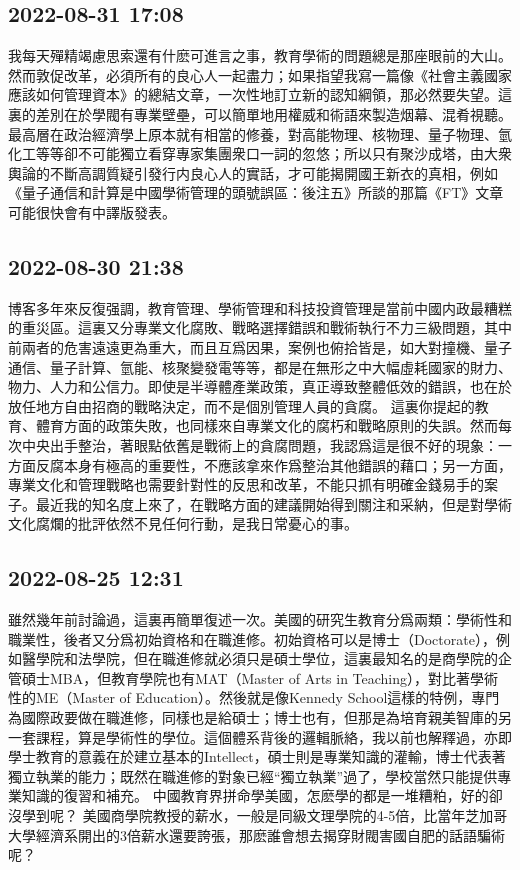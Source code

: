 \documentclass[twocolumn]{ctexart}
\begin{document}
\subsection*{2022-08-31 17:08}

我每天殫精竭慮思索還有什麽可進言之事，教育學術的問題總是那座眼前的大山。然而敦促改革，必須所有的良心人一起盡力；如果指望我寫一篇像《社會主義國家應該如何管理資本》的總結文章，一次性地訂立新的認知綱領，那必然要失望。這裏的差別在於學閥有專業壁壘，可以簡單地用權威和術語來製造烟幕、混肴視聽。最高層在政治經濟學上原本就有相當的修養，對高能物理、核物理、量子物理、氫化工等等卻不可能獨立看穿專家集團衆口一詞的忽悠；所以只有聚沙成塔，由大衆輿論的不斷高調質疑引發行内良心人的實話，才可能揭開國王新衣的真相，例如《量子通信和計算是中國學術管理的頭號誤區：後注五》所談的那篇《FT》文章可能很快會有中譯版發表。
\subsection*{2022-08-30 21:38}

博客多年來反復强調，教育管理、學術管理和科技投資管理是當前中國内政最糟糕的重災區。這裏又分專業文化腐敗、戰略選擇錯誤和戰術執行不力三級問題，其中前兩者的危害遠遠更為重大，而且互爲因果，案例也俯拾皆是，如大對撞機、量子通信、量子計算、氫能、核聚變發電等等，都是在無形之中大幅虛耗國家的財力、物力、人力和公信力。即使是半導體產業政策，真正導致整體低效的錯誤，也在於放任地方自由招商的戰略決定，而不是個別管理人員的貪腐。
這裏你提起的教育、體育方面的政策失敗，也同樣來自專業文化的腐朽和戰略原則的失誤。然而每次中央出手整治，著眼點依舊是戰術上的貪腐問題，我認爲這是很不好的現象：一方面反腐本身有極高的重要性，不應該拿來作爲整治其他錯誤的藉口；另一方面，專業文化和管理戰略也需要針對性的反思和改革，不能只抓有明確金錢易手的案子。最近我的知名度上來了，在戰略方面的建議開始得到關注和采納，但是對學術文化腐爛的批評依然不見任何行動，是我日常憂心的事。
\subsection*{2022-08-25 12:31}

雖然幾年前討論過，這裏再簡單復述一次。美國的研究生教育分爲兩類：學術性和職業性，後者又分爲初始資格和在職進修。初始資格可以是博士（Doctorate），例如醫學院和法學院，但在職進修就必須只是碩士學位，這裏最知名的是商學院的企管碩士MBA，但教育學院也有MAT（Master of Arts in Teaching），對比著學術性的ME（Master of Education）。然後就是像Kennedy School這樣的特例，專門為國際政要做在職進修，同樣也是給碩士；博士也有，但那是為培育親美智庫的另一套課程，算是學術性的學位。這個體系背後的邏輯脈絡，我以前也解釋過，亦即學士教育的意義在於建立基本的Intellect，碩士則是專業知識的灌輸，博士代表著獨立執業的能力；既然在職進修的對象已經“獨立執業”過了，學校當然只能提供專業知識的復習和補充。
中國教育界拼命學美國，怎麽學的都是一堆糟粕，好的卻沒學到呢？
美國商學院教授的薪水，一般是同級文理學院的4-5倍，比當年芝加哥大學經濟系開出的3倍薪水還要誇張，那麽誰會想去揭穿財閥害國自肥的話語騙術呢？
\end{document}
